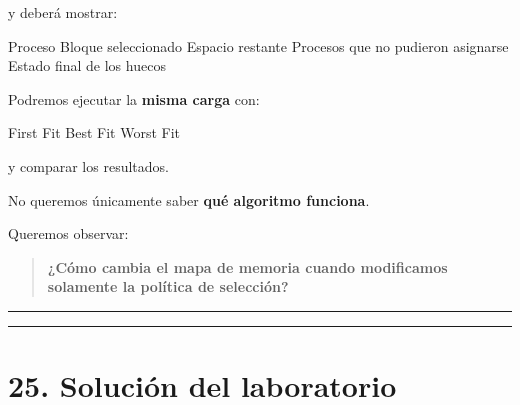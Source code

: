 \documentclass[
  spanish,
  letterpaper,
]{scrbook}
\newenvironment{Shaded}{\begin{snugshade}}{\end{snugshade}}
\newcommand{\NormalTok}[1]{\textcolor[rgb]{0.00,0.23,0.31}{#1}}
\begin{document}
y deberá mostrar:

\begin{Shaded}
\begin{Highlighting}[]
\NormalTok{Proceso}
\NormalTok{Bloque seleccionado}
\NormalTok{Espacio restante}
\NormalTok{Procesos que no pudieron asignarse}
\NormalTok{Estado final de los huecos}
\end{Highlighting}
\end{Shaded}

Podremos ejecutar la \textbf{misma carga} con:

\begin{Shaded}
\begin{Highlighting}[]
\NormalTok{First Fit}
\NormalTok{Best Fit}
\NormalTok{Worst Fit}
\end{Highlighting}
\end{Shaded}

y comparar los resultados.

\begin{tcolorbox}[enhanced jigsaw, arc=.35mm, bottomrule=.15mm, bottomtitle=1mm, breakable, colback=white, colbacktitle=quarto-callout-tip-color!10!white, colframe=quarto-callout-tip-color-frame, coltitle=black, left=2mm, leftrule=.75mm, opacityback=0, opacitybacktitle=0.6, rightrule=.15mm, title=\textcolor{quarto-callout-tip-color}{\faLightbulb}\hspace{0.5em}{La pregunta del laboratorio}, titlerule=0mm, toprule=.15mm, toptitle=1mm]

No queremos únicamente saber \textbf{qué algoritmo funciona}.

Queremos observar:

\begin{quote}
\textbf{¿Cómo cambia el mapa de memoria cuando modificamos solamente la
política de selección?}
\end{quote}

\end{tcolorbox}

\begin{center}\rule{0.5\linewidth}{0.5pt}\end{center}

\begin{center}\rule{0.5\linewidth}{0.5pt}\end{center}


\chapter{25. Solución del
laboratorio}\label{soluciuxf3n-del-laboratorio}
\end{document}
